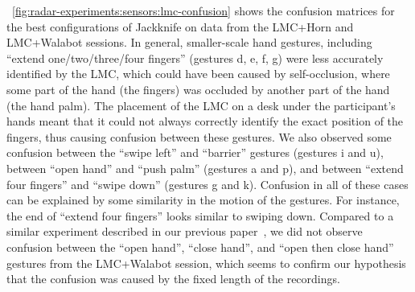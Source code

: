\fig~\ref{fig:radar-experiments:sensors:lmc-confusion} shows the confusion matrices for the best configurations of Jackknife on data from the LMC+Horn and LMC+Walabot sessions. 
%
In general, smaller-scale hand gestures, including ``extend one/two/three/four fingers'' (gestures d, e, f, g) were less accurately identified by the LMC, which could have been caused by self-occlusion, where some part of the hand (\eg the fingers) was occluded by another part of the hand (\eg the hand palm). The placement of the LMC on a desk under the participant's hands meant that it could not always correctly identify the exact position of the fingers, thus causing confusion between these gestures.
%
We also observed some confusion between the ``swipe left'' and ``barrier'' gestures (gestures i and u), between ``open hand'' and ``push palm'' (gestures a and p), and between ``extend four fingers'' and ``swipe down'' (gestures g and k). Confusion in all of these cases can be explained by some similarity in the motion of the gestures. For instance, the end of ``extend four fingers'' looks similar to swiping down.
%
Compared to a similar experiment described in our previous paper~\cite{Sluyters:2022:IUI}, we did not observe confusion between the ``open hand'', ``close hand'', and ``open then close hand'' gestures from the LMC+Walabot session, which seems to confirm our hypothesis that the confusion was caused by the fixed length of the recordings.



